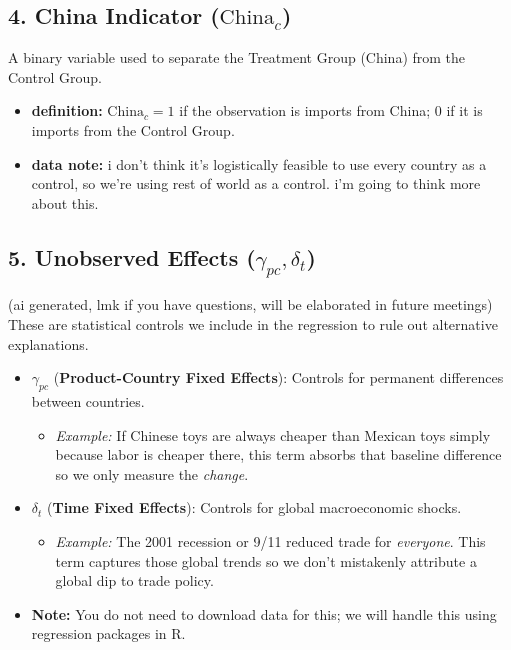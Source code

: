 \documentclass[12pt]{article}
\begin{document}
\subsection*{4. China Indicator ($\text{China}_c$)}
A binary variable used to separate the Treatment Group (China) from the Control Group.
\begin{itemize}
    \item \textbf{definition:} $\text{China}_c = 1$ if the observation is imports from China; $0$ if it is imports from the Control Group.
    \item \textbf{data note:} i don't think it's logistically feasible to use every country as a control, so we're using rest of world as a control. i'm going to think more about this.
\end{itemize}


\subsection*{5. Unobserved Effects ($\gamma_{pc}, \delta_t$)} (ai generated, lmk if you have questions, will be elaborated in future meetings)
These are statistical controls we include in the regression to rule out alternative explanations.
\begin{itemize}
    \item $\gamma_{pc}$ (\textbf{Product-Country Fixed Effects}): Controls for permanent differences between countries.
          \begin{itemize}
              \item \textit{Example:} If Chinese toys are always cheaper than Mexican toys simply because labor is cheaper there, this term absorbs that baseline difference so we only measure the \textit{change}.
          \end{itemize}
    \item $\delta_t$ (\textbf{Time Fixed Effects}): Controls for global macroeconomic shocks.
          \begin{itemize}
              \item \textit{Example:} The 2001 recession or 9/11 reduced trade for \textit{everyone}. This term captures those global trends so we don't mistakenly attribute a global dip to trade policy.
          \end{itemize}
    \item \textbf{Note:} You do not need to download data for this; we will handle this using regression packages in R.
\end{itemize}
\end{document}
